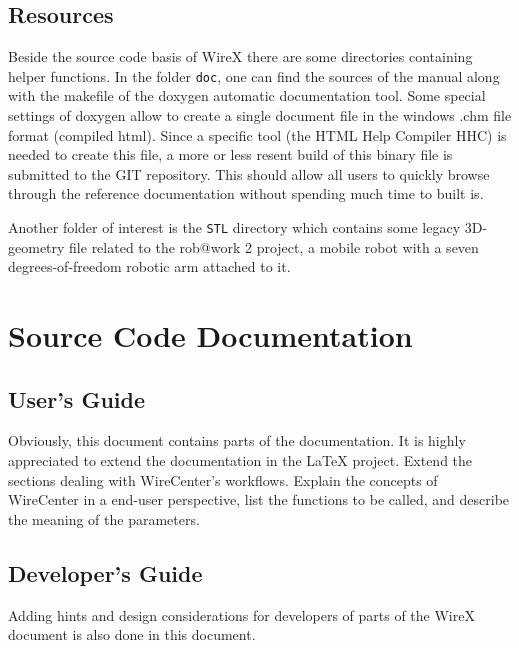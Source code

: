 \documentclass[11pt,a4paper,onepage,openany]{book}
\begin{document}
\section{Resources}
Beside the source code basis of WireX there are some directories containing
helper functions. In the folder \texttt{doc}, one can find the sources of the
manual along with the makefile of the doxygen automatic documentation tool.
Some special settings of doxygen allow to create a single document file in the
windows .chm file format (compiled html). Since a specific tool (the HTML Help
Compiler HHC) is needed to create this file, a more or less resent build of
this binary file is submitted to the GIT repository. This should allow all
users to quickly browse through the reference documentation without spending
much time to built is.

Another folder of interest is the \texttt{STL} directory which contains some
legacy 3D-geometry file related to the rob@work 2 project, a mobile robot with
a seven degrees-of-freedom robotic arm attached to it.


\chapter{Source Code Documentation}
\section{User's Guide}
Obviously, this document contains parts of the documentation. It is highly
appreciated to extend the documentation in the LaTeX project. Extend the
sections dealing with WireCenter's workflows. Explain the concepts of
WireCenter in a end-user perspective, list the functions to be called, and
describe the meaning of the parameters.

\section{Developer's Guide}
Adding hints and design considerations for developers of parts of the WireX
document is also done in this document.
\end{document}
